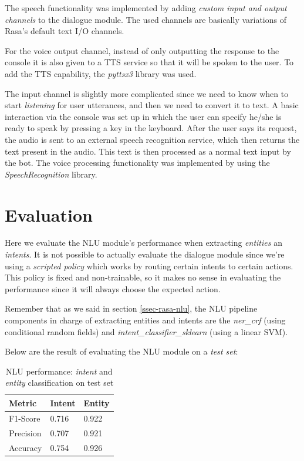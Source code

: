 \documentclass[11pt,a4paper]{article}
\begin{document}
			The speech functionality was implemented by adding \textit{custom input and output channels} to the dialogue module. The used channels are basically variations of Rasa's default text I/O channels. 
			
			For the voice output channel, instead of only outputting the response to the console it is also given to a TTS service so that it will be spoken to the user. To add the TTS capability, the \textit{pyttsx3} \cite{ttspy} library was used.
			
			The input channel is slightly more complicated since we need to know when to start \textit{listening} for user utterances, and then we need to convert it to text. A basic interaction via the console was set up in which the user can specify he/she is ready to speak by pressing a key in the keyboard. After the user says its request, the audio is sent to an external speech recognition service, which then returns the text present in the audio. This text is then processed as a normal text input by the bot. The voice processing functionality was implemented by using the \textit{SpeechRecognition} \cite{SpeechRecognition} library.
			
			
\section{Evaluation}
\label{sec-evaluation}

	Here we evaluate the NLU module's performance when extracting \textit{entities} an \textit{intents}. It is not possible to actually evaluate the dialogue module since we're using a \textit{scripted policy} which works by routing certain intents to certain actions. This policy is fixed and non-trainable, so it makes no sense in evaluating the performance since it will always choose the expected action. 
	
	Remember that as we said in section \ref{ssec-rasa-nlu}, the NLU pipeline components in charge of extracting entities and intents are the \textit{ner\_crf} (using conditional random fields) and \textit{intent\_classifier\_sklearn} (using a linear SVM).
	
	Below are the result of evaluating the NLU module on a \textit{test set}:
	
	\begin{table}[h!]
		\centering
		\begin{tabular}{l|l|l}
			\textbf{Metric} & \textbf{Intent} & \textbf{Entity} \\ 
			\hline 
			F1-Score & 0.716 & 0.922 \\ 
			\hline 
			Precision & 0.707 & 0.921 \\ 
			\hline 
			Accuracy & 0.754 & 0.926\\ 
			\hline 
		\end{tabular} 
		\caption{NLU performance: \textit{intent} and \textit{entity} classification on test set}
		\label{table:1}
	\end{table}
		
\end{document}
